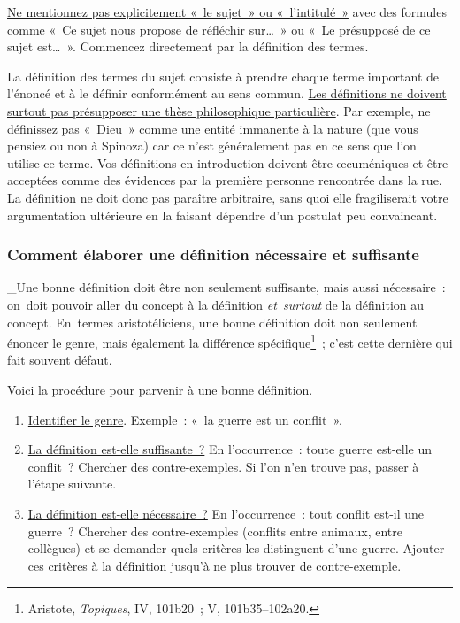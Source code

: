 \documentclass[a4paper,12pt]{article}
\begin{document}
\uline{Ne mentionnez pas explicitement « le sujet » ou « l'intitulé »} avec
des formules comme « Ce sujet nous propose de réfléchir sur\ldots{} » ou « Le
présupposé de ce sujet est\ldots{} ». Commencez directement par la définition
des termes.

La définition des termes du sujet consiste à prendre chaque terme
important de l'énoncé et à le définir conformément au sens commun. \uline{Les
définitions ne doivent surtout pas présupposer une thèse philosophique
particulière}. Par exemple, ne définissez pas « Dieu » comme une entité
immanente à la nature (que vous pensiez ou non à Spinoza) car ce n'est
généralement pas en ce sens que l'on utilise ce terme. Vos définitions
en introduction doivent être œcuméniques et être acceptées comme des
évidences par la première personne rencontrée dans la rue. La définition
ne doit donc pas paraître arbitraire, sans quoi elle fragiliserait votre
argumentation ultérieure en la faisant dépendre d'un postulat peu
convaincant.

\subsubsection{Comment élaborer une définition nécessaire et suffisante}
\label{sec:orgd93203a}

\_Une bonne définition doit être non seulement suffisante, mais aussi
nécessaire : on doit pouvoir aller du concept à la définition
\emph{et surtout} de la définition au concept. En termes aristotéliciens, une
bonne définition doit non seulement énoncer le genre, mais également la
différence spécifique\footnote{Aristote, \emph{Topiques}, IV, 101b20 ; V, 101b35--102a20.} ; c'est cette dernière qui fait souvent
défaut.

Voici la procédure pour parvenir à une bonne définition. 

\begin{enumerate}
\item \uline{Identifier le genre}. Exemple : « la guerre est un conflit ».
\item \uline{La définition est-elle suffisante ?} En l'occurrence : toute guerre
est-elle un conflit ? Chercher des contre-exemples. Si l'on n'en
trouve pas, passer à l'étape suivante.
\item \uline{La définition est-elle nécessaire ?} En l'occurrence : tout conflit
est-il une guerre ? Chercher des contre-exemples (conflits entre
animaux, entre collègues) et se demander quels critères les
distinguent d'une guerre. Ajouter ces critères à la définition
jusqu'à ne plus trouver de contre-exemple.
\end{enumerate}
\end{document}
